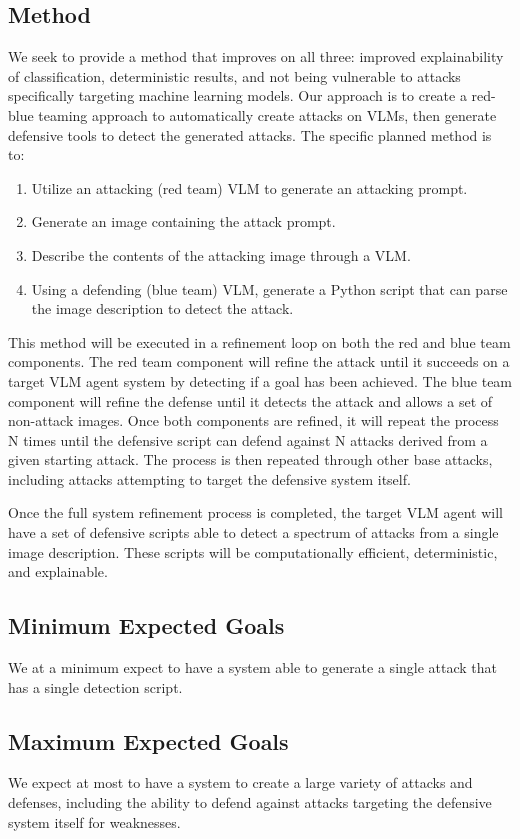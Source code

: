 \documentclass[10pt,twocolumn,letterpaper]{article}
\begin{document}
\subsection{Method}
We seek to provide a method that improves on all three: improved explainability of classification, deterministic results, and not being vulnerable to attacks specifically targeting machine learning models.
Our approach is to create a red-blue teaming approach to automatically create attacks on VLMs, then generate defensive tools to detect the generated attacks.
The specific planned method is to: 

\begin{enumerate}
\item Utilize an attacking (red team) VLM to generate an attacking prompt. 
\item Generate an image containing the attack prompt. 
\item Describe the contents of the attacking image through a VLM. 
\item Using a defending (blue team) VLM, generate a Python script that can parse the image description to detect the attack.
\end{enumerate}

This method will be executed in a refinement loop on both the red and blue team components.
The red team component will refine the attack until it succeeds on a target VLM agent system by detecting if a goal has been achieved.
The blue team component will refine the defense until it detects the attack and allows a set of non-attack images.
Once both components are refined, it will repeat the process N times until the defensive script can defend against N attacks derived from a given starting attack.
The process is then repeated through other base attacks, including attacks attempting to target the defensive system itself.

Once the full system refinement process is completed, the target VLM agent will have a set of defensive scripts able to detect a spectrum of attacks from a single image description.
These scripts will be computationally efficient, deterministic, and explainable.

\subsection{Minimum Expected Goals}
We at a minimum expect to have a system able to generate a single attack that has a single detection script.

\subsection{Maximum Expected Goals}
We expect at most to have a system to create a large variety of attacks and defenses, including the ability to defend against attacks targeting the defensive system itself for weaknesses.
\end{document}
